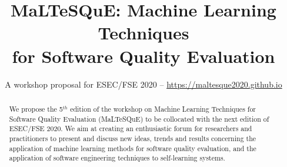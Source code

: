 \documentclass[sigconf]{acmart}
\begin{document}
\title{MaLTeSQuE: Machine Learning Techniques\\for Software Quality Evaluation}
\subtitle{A workshop proposal for ESEC/FSE 2020 -- \url{https://maltesque2020.github.io}}



\begin{abstract}
We propose the 5$^{th}$ edition of the workshop on Machine Learning Techniques for Software Quality Evaluation (MaLTeSQuE) to be collocated with the next edition of ESEC/FSE 2020.
We aim at creating an enthusiastic forum for researchers and practitioners to present and discuss new ideas, trends and results concerning the application of machine learning methods for software quality evaluation, and the application of software engineering techniques to self-learning systems.
\end{abstract}


\maketitle








\balance

	
\end{document}
